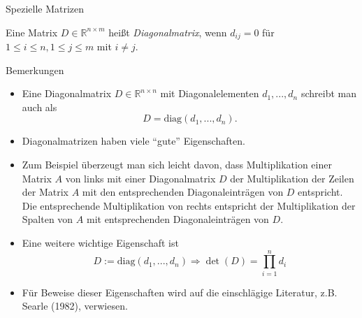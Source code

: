 \documentclass[
  8pt,
  ignorenonframetext,
]{beamer}
\providecommand{\tightlist}{%
  \setlength{\itemsep}{0pt}\setlength{\parskip}{0pt}}
\begin{document}
\begin{frame}{Spezielle Matrizen}
\protect\hypertarget{spezielle-matrizen-2}{}
\footnotesize
\begin{definition}[Diagonalmatrix]
Eine Matrix $D \in \mathbb{R}^{n \times m}$ heißt \textit{Diagonalmatrix}, wenn $d_{ij} = 0$ für $1 \le i \le n, 1 \le j \le m$ mit $i \neq j$.
\end{definition}

Bemerkungen

\begin{itemize}
\tightlist
\item
  \justifying Eine Diagonalmatrix \(D\in \mathbb{R}^{n \times n}\) mit
  Diagonalelementen \(d_1,...,d_n\) schreibt man auch als
  \begin{equation}
  D = \mbox{diag}(d_1,...,d_n).
  \end{equation}
\item
  Diagonalmatrizen haben viele ``gute'' Eigenschaften.
\item
  Zum Beispiel überzeugt man sich leicht davon, dass Multiplikation
  einer Matrix \(A\) von links mit einer Diagonalmatrix \(D\) der
  Multiplikation der Zeilen der Matrix \(A\) mit den entsprechenden
  Diagonaleinträgen von \(D\) entspricht. Die entsprechende
  Multiplikation von rechts entspricht der Multiplikation der Spalten
  von \(A\) mit entsprechenden Diagonaleinträgen von \(D\).
\item
  Eine weitere wichtige Eigenschaft ist \begin{equation}
  D := \mbox{diag}(d_1,...,d_n) \Rightarrow \det(D) = \prod_{i=1}^n d_i
  \end{equation}
\item
  Für Beweise dieser Eigenschaften wird auf die einschlägige Literatur,
  z.B. Searle (1982), verwiesen.
\end{itemize}
\end{frame}
\end{document}
